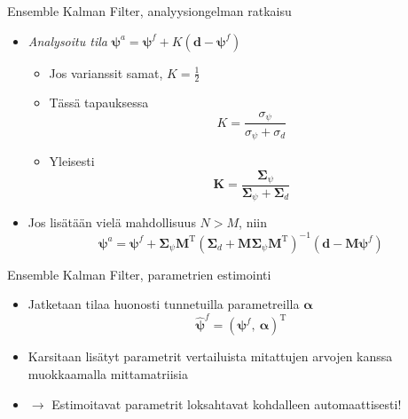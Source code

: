 \documentclass{beamer}
\begin{document}
\begin{frame}{Ensemble Kalman Filter, analyysiongelman ratkaisu}

\begin{itemize}
\item \emph{Analysoitu tila} $\boldsymbol{\psi}^a = \boldsymbol{\psi}^f + K\left(\boldsymbol{d}-\boldsymbol{\psi}^f\right)$
\begin{itemize}
\item Jos varianssit samat, $K = \frac{1}{2}$
\item Tässä tapauksessa \[ K = \frac{\sigma_\psi}{\sigma_\psi+\sigma_d} \]
\item Yleisesti \[ \mathbf{K} = \frac{\boldsymbol{\Sigma}_\psi}{\boldsymbol{\Sigma}_\psi+\boldsymbol{\Sigma}_d} \]
\end{itemize}
\item Jos lisätään vielä mahdollisuus $N > M$, niin 
\[
\boldsymbol{\psi}^a = \boldsymbol{\psi}^f + \boldsymbol{\Sigma}_\psi \mathbf{M}^\mathrm{T} \left(\boldsymbol{\Sigma}_d+\mathbf{M}\boldsymbol{\Sigma}_\psi\mathbf{M}^\mathrm{T}\right)^{-1}\left(\boldsymbol{d}-\mathbf{M}\boldsymbol{\psi}^f\right)
\]
\end{itemize}

\end{frame}

\begin{frame}{Ensemble Kalman Filter, parametrien estimointi}

\begin{itemize}
\item Jatketaan tilaa huonosti tunnetuilla parametreilla $\boldsymbol{\alpha}$
\[ \boldsymbol{\hat{\psi}}^f = \left(\boldsymbol{\psi}^f,~\boldsymbol{\alpha}\right)^\mathrm{T} \]
\item Karsitaan lisätyt parametrit vertailuista mitattujen arvojen kanssa muokkaamalla mittamatriisia
\item $\rightarrow$ Estimoitavat parametrit loksahtavat kohdalleen automaattisesti!
\end{itemize}

\end{frame}
\end{document}
